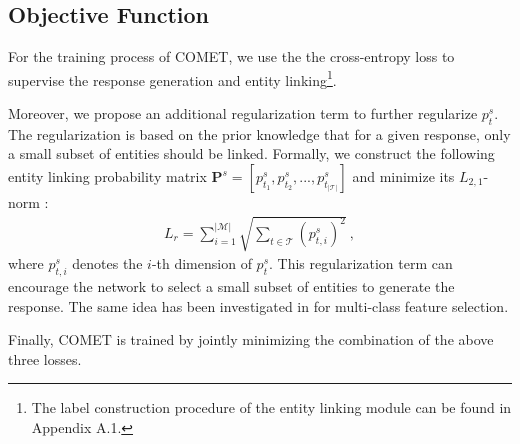 \documentclass[11pt]{article}
\begin{document}
\subsection{Objective Function}

For the training process of COMET, we use the the cross-entropy loss to supervise the response generation and entity linking\footnote{The label construction procedure of the entity linking module can be found in Appendix A.1.}.


Moreover, we propose an additional regularization term to further regularize $p^s_t$. The regularization is based on the prior knowledge that for a given response, only a small subset of entities should be linked. Formally, we construct 
the following entity linking probability matrix  $\mathbf{P}^{s} = [p^s_{t_1}, p^s_{t_2}, ..., p^s_{t_{|\mathcal{T}|}}]$ and minimize its $L_{2,1}$-norm \cite{nie2010efficient}:
\begin{gather}
    L_r = \sum_{i=1}^{|\mathcal{M}|}\sqrt{\sum_{t \in \mathcal{T}}(p^s_{t, i})^2} \ , \nonumber
\end{gather}
where $p^s_{t, i}$ denotes the $i$-th dimension of $p^s_{t}$. This regularization term can encourage the network to select a small subset of entities to generate the response. The same idea has been investigated in \cite{nie2010efficient} for multi-class feature selection.

Finally, COMET is trained by jointly minimizing the combination of the above three losses.
\end{document}
